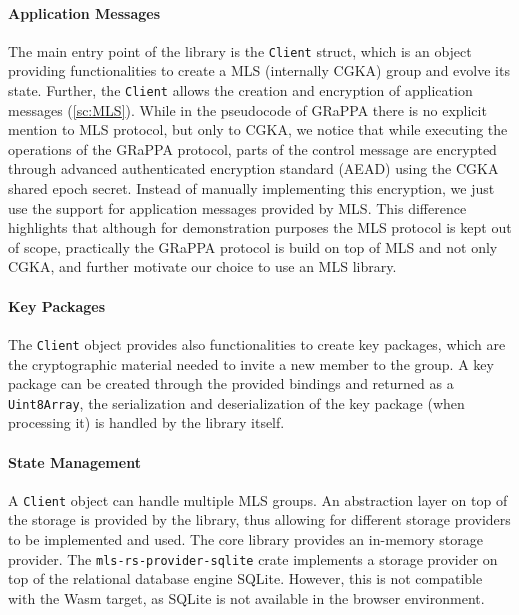 \paragraph{Application Messages}
The main entry point of the library is the \texttt{Client} struct, which
is an object providing functionalities to create a MLS (internally CGKA)
group and evolve its state. Further, the \texttt{Client} allows the creation
and encryption of application messages (\cref{sc:MLS}). While in the pseudocode 
of GRaPPA there is no explicit mention to MLS protocol, but only to CGKA,
we notice that while executing the operations of the GRaPPA protocol,
parts of the control message are encrypted through advanced authenticated
encryption standard (AEAD) using the CGKA shared epoch secret.
Instead of manually implementing this encryption, we just use the
support for application messages provided by MLS. This difference highlights
that although for demonstration purposes the MLS protocol is kept out of scope,
practically the GRaPPA protocol is build on top of MLS and not only CGKA, 
and further motivate our choice to use an MLS library.

\paragraph{Key Packages}
The \texttt{Client} object provides also functionalities to create
key packages, which are the cryptographic material needed to invite
a new member to the group. A key package can be created through the provided
bindings and returned as a \texttt{Uint8Array}, the serialization and
deserialization of the key package (when processing it) is handled by the 
library itself. 


\paragraph{State Management}
A \texttt{Client} object can handle multiple MLS groups.
An abstraction layer on top of the storage is provided by the library,
thus allowing for different storage providers to be implemented and used.
The core library provides an in-memory storage provider.
The \texttt{mls-rs-provider-sqlite} crate implements a storage provider
on top of the relational database engine SQLite. However, this is not compatible
with the Wasm target, as SQLite is not available in the browser environment.

